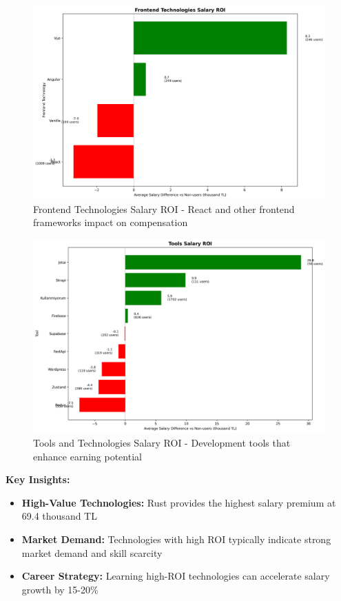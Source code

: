 \documentclass[12pt,a4paper]{article}
\begin{document}
\begin{figure}[H]
    \centering
    \includegraphics[width=\textwidth]{figures/barplot_frontend_roi.png}
    \caption{Frontend Technologies Salary ROI - React and other frontend frameworks impact on compensation}
\end{figure}

\begin{figure}[H]
    \centering
    \includegraphics[width=\textwidth]{figures/barplot_tools_roi.png}
    \caption{Tools and Technologies Salary ROI - Development tools that enhance earning potential}
\end{figure}

\textbf{Key Insights:}
\begin{itemize}
    \item \textbf{High-Value Technologies:} Rust provides the highest salary premium at 69.4 thousand TL
    \item \textbf{Market Demand:} Technologies with high ROI typically indicate strong market demand and skill scarcity
    \item \textbf{Career Strategy:} Learning high-ROI technologies can accelerate salary growth by 15-20\%
\end{itemize}
\end{document}
